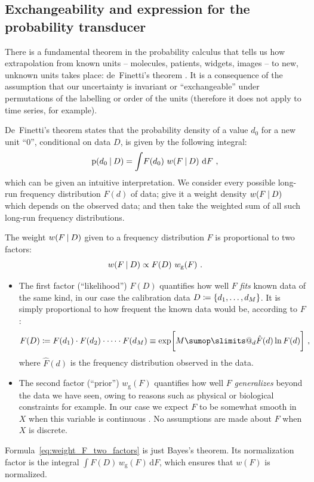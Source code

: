 \documentclass[\ifafour a4paper,12pt,\else a5paper,10pt,\fi%
onecolumn,oneside,article,%
british%
]{memoir}
\makeatletter
\theoremstyle{remark}
\theoremstyle{innote}
\def\sum{\DOTSI\sumop\slimits@}
\newcommand*{\wrench}{{\fontencoding{U}\fontfamily{fontawesomethree}\selectfont\symbol{114}}}
\newcommand{\mynotew}[1]{{\footnotesize\color{notecolour}\wrench\ #1}}
\newcommand*{\di}{\mathrm{d}}%
\newcommand*{\defd}{\coloneqq}
\DeclarePairedDelimiter\set{\{}{\}} %
\newcommand*{\p}{\mathrm{p}}%
\renewcommand*{\|}[1][]{\nonscript\:#1\vert\nonscript\:\mathopen{}}
\newcommand*{\chap}{ch.}%
\newcommand*{\wf}{w}
\newcommand*{\wfo}{w_{\textrm{g}}}
\makeatother
\begin{document}
\subsection{Exchangeability and expression for the probability transducer}
\label{sec:deFinetti}



There is a fundamental theorem in the probability calculus that tells us how extrapolation from known units -- molecules, patients, widgets, images -- to new, unknown units takes place: de~Finetti's theorem \autocites[\chap~4]{bernardoetal1994_r2000}{dawid2013,definetti1929,definetti1937}. It is a consequence of the assumption that our uncertainty is invariant or \enquote{exchangeable} under permutations of the labelling or order of the units (therefore it does not apply to time series, for example).

De~Finetti's theorem states that the probability density of a value $d_{0}$ for a new unit \enquote{0}, conditional on data $D$, is given by the following integral:
\begin{equation}
  \label{eq:prob_is_expe_freq}
  \p(d_{0} \| D) = \int\! F(d_{0})\ \wf(F \| D)\ \di F \ ,
\end{equation}
which can be given an intuitive interpretation. We consider every possible long-run frequency distribution $F(d)$ of data; give it a weight density $\wf(F \| D)$ which depends on the observed data; and then take the weighted sum of all such long-run frequency distributions.

The weight $\wf(F \| D)$ given to a frequency distribution $F$ is proportional to two factors:
\begin{equation}
  \label{eq:weight_F_two_factors}
  \wf(F \| D) \propto F(D)\ \wfo(F) \ .
\end{equation}
\begin{itemize}
  \item The first factor (\enquote{likelihood}) $F(D)$ quantifies how well $F$ \emph{fits} known data of the same kind, in our case the calibration data $D \defd \set{d_{1}, \dotsc, d_{M}}$. It is simply proportional to how frequent the known data would be, according to $F$:
  \begin{equation}
    \label{eq:factor_likelihood}
    F(D) \defd F(d_{1})\cdot F(d_{2})\cdot \dotsm\cdot F(d_{M})
    \equiv \exp\biggl[M \sum_{d} \hat{F}(d) \ln F(d)\biggr] \ ,
  \end{equation}
where $\hat{F}(d)$ is the frequency distribution observed in the data.
  
\item The second factor (\enquote{prior}) $\wfo(F)$ quantifies how well $F$ \emph{generalizes} beyond the data we have seen, owing to reasons such as physical or biological constraints for example. In our case we expect $F$ to be somewhat smooth in $X$ when this variable is continuous \autocites[Cf.][]{goodetal1971}. No assumptions are made about $F$ when $X$ is discrete.
\end{itemize}
Formula~\eqref{eq:weight_F_two_factors} is just Bayes's theorem. Its normalization factor is the integral $\int F(D)\, \wfo(F)\, \di F$, which ensures that $\wf(F)$ is normalized.
\end{document}
